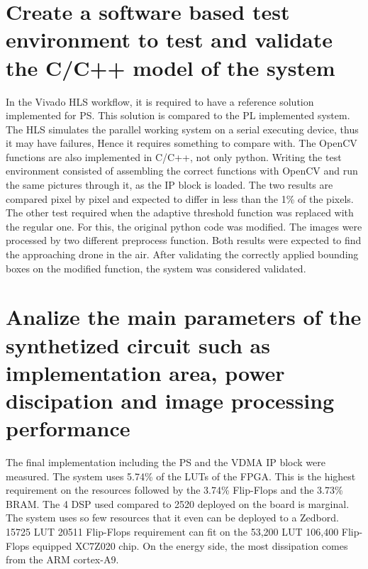 \section{Create a software based test environment to test and validate the C/C++ model of the system} %
In the Vivado HLS workflow, it is required to have a reference solution implemented for PS.
This solution is compared to the PL implemented system.
The HLS simulates the parallel working system on a serial executing device, thus it may have failures, Hence it requires something to compare with.
The OpenCV functions are also implemented in C/C++, not only python.
Writing the test environment consisted of assembling the correct functions with OpenCV and run the same pictures through it, as the IP block is loaded.
The two results are compared pixel by pixel and expected to differ in less than the 1\% of the pixels.
The other test required when the adaptive threshold function was replaced with the regular one.
For this, the original python code was modified.
The images were processed by two different preprocess function.
Both results were expected to find the approaching drone in the air.
After validating the correctly applied bounding boxes on the modified function, the system was considered validated.

\section{Analize the main parameters of the synthetized circuit such as implementation area, power discipation and image processing performance} %
The final implementation including the PS and the VDMA IP block were measured.
The system uses 5.74\% of the LUTs of the FPGA.
This is the highest requirement on the resources followed by the 3.74\% Flip-Flops and the 3.73\% BRAM.
The 4 DSP used compared to 2520 deployed on the board is marginal.
The system uses so few resources that it even can be deployed to a Zedbord.
15725 LUT 20511 Flip-Flops requirement can fit on the 53,200 LUT 106,400 Flip-Flops equipped XC7Z020 chip.
On the energy side, the most dissipation comes from the ARM cortex-A9.



\clearpage